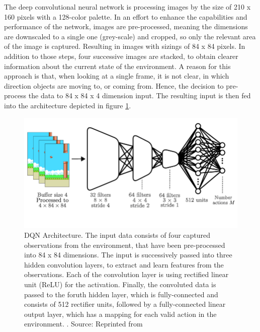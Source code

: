 The deep convolutional neural network is processing images by the size of 210 x 160 pixels with a 128-color palette. In an effort to enhance the capabilities and performance of the network, images are pre-processed, meaning the dimensions are downscaled to a single one (grey-scale) and cropped, so only the relevant area of the image is captured. Resulting in images with sizings of 84 x 84 pixels. In addition to those steps, four successive images are stacked, to obtain clearer information about the current state of the environment. A reason for this approach is that, when looking at a single frame, it is not clear, in which direction objects are moving to, or coming from. Hence, the decision to pre-process the data to 84 x 84 x 4 dimension input. The resulting input is then fed into the architecture depicted in figure \ref{fig:dqn_arch}.



\begin{figure}[H]
  \centering
  \includegraphics[scale=0.45]{images/dqn_arch}
  \caption[DQN Architecture]{DQN Architecture. The input data consists of four captured observations from the environment, that have been pre-processed into 84 x 84 dimensions. The input is successively passed into three hidden convolution layers, to extract and learn features from the observations. Each of the convolution layer is using rectified linear unit (ReLU) for the activation. Finally, the convoluted data is passed to the foruth hidden layer, which is fully-connected and consists of 512 rectifier units, followed by a fully-connected linear output layer, which has a mapping for each valid action in the environment. \protect\cite{mnih2015human}. Source: Reprinted from \protect\cite{Spears2017ScaleInvariant}}
  \label{fig:dqn_arch}
\end{figure}  



